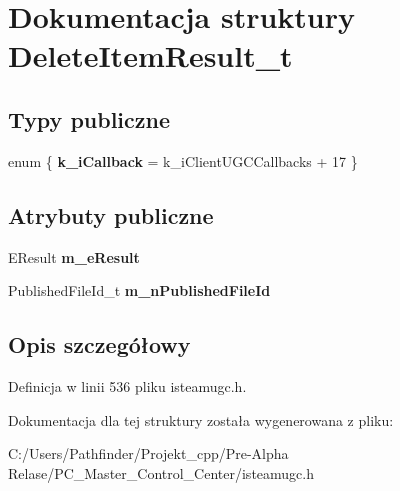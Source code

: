 \hypertarget{struct_delete_item_result__t}{}\section{Dokumentacja struktury Delete\+Item\+Result\+\_\+t}
\label{struct_delete_item_result__t}
\subsection*{Typy publiczne}
\begin{DoxyCompactItemize}
\item 
\mbox{\label{struct_delete_item_result__t_af396c2458716c6564e8f087af0698206}} 
enum \{ {\bfseries k\+\_\+i\+Callback} = k\+\_\+i\+Client\+U\+G\+C\+Callbacks + 17
 \}
\end{DoxyCompactItemize}
\subsection*{Atrybuty publiczne}
\begin{DoxyCompactItemize}
\item 
\mbox{\label{struct_delete_item_result__t_abd04a6fc03ae16fc7786d9969445f267}} 
E\+Result {\bfseries m\+\_\+e\+Result}
\item 
\mbox{\label{struct_delete_item_result__t_a96145271ab7a1512e4ff1f905b0fa6a4}} 
Published\+File\+Id\+\_\+t {\bfseries m\+\_\+n\+Published\+File\+Id}
\end{DoxyCompactItemize}


\subsection{Opis szczegółowy}


Definicja w linii 536 pliku isteamugc.\+h.



Dokumentacja dla tej struktury została wygenerowana z pliku\+:\begin{DoxyCompactItemize}
\item 
C\+:/\+Users/\+Pathfinder/\+Projekt\+\_\+cpp/\+Pre-\/\+Alpha Relase/\+P\+C\+\_\+\+Master\+\_\+\+Control\+\_\+\+Center/isteamugc.\+h\end{DoxyCompactItemize}
